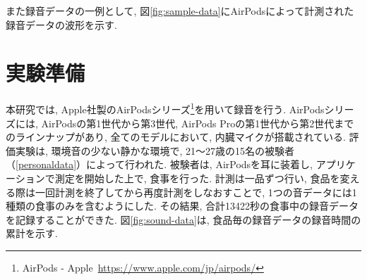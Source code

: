 また録音データの一例として, 図\ref{fig:sample-data}にAirPodsによって計測された録音データの波形を示す.

\section{実験準備}

本研究では, Apple社製のAirPodsシリーズ\footnote{AirPods - Apple~\url{https://www.apple.com/jp/airpods/}}を用いて録音を行う. AirPodsシリーズには, AirPodsの第1世代から第3世代, AirPods Proの第1世代から第2世代までのラインナップがあり, 全てのモデルにおいて, 内臓マイクが搭載されている. 評価実験は, 環境音の少ない静かな環境で, 21〜27歳の15名の被験者（\tablename\ref{personaldata}）によって行われた. 被験者は, AirPodsを耳に装着し, アプリケーションで測定を開始した上で, 食事を行った. 計測は一品ずつ行い, 食品を変える際は一回計測を終了してから再度計測をしなおすことで, 1つの音データには1種類の食事のみを含むようにした. その結果, 合計13422秒の食事中の録音データを記録することができた. 図\ref{fig:sound-data}は, 食品毎の録音データの録音時間の累計を示す.

